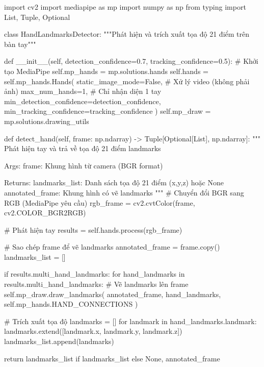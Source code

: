 \begin{aivncodebox}
\begin{python}
import cv2
import mediapipe as mp
import numpy as np
from typing import List, Tuple, Optional

class HandLandmarksDetector:
    """Phát hiện và trích xuất tọa độ 21 điểm trên bàn tay"""
    
    def __init__(self, detection_confidence=0.7, tracking_confidence=0.5):
        # Khởi tạo MediaPipe
        self.mp_hands = mp.solutions.hands
        self.hands = self.mp_hands.Hands(
            static_image_mode=False,        # Xử lý video (không phải ảnh)
            max_num_hands=1,                # Chỉ nhận diện 1 tay
            min_detection_confidence=detection_confidence,
            min_tracking_confidence=tracking_confidence
        )
        self.mp_draw = mp.solutions.drawing_utils
    
    def detect_hand(self, frame: np.ndarray) -> Tuple[Optional[List], np.ndarray]:
        """
        Phát hiện tay và trả về tọa độ 21 điểm landmarks
        
        Args:
            frame: Khung hình từ camera (BGR format)
            
        Returns:
            landmarks_list: Danh sách tọa độ 21 điểm (x,y,z) hoặc None
            annotated_frame: Khung hình có vẽ landmarks
        """
        # Chuyển đổi BGR sang RGB (MediaPipe yêu cầu)
        rgb_frame = cv2.cvtColor(frame, cv2.COLOR_BGR2RGB)
        
        # Phát hiện tay
        results = self.hands.process(rgb_frame)
        
        # Sao chép frame để vẽ landmarks
        annotated_frame = frame.copy()
        landmarks_list = []
        
        if results.multi_hand_landmarks:
            for hand_landmarks in results.multi_hand_landmarks:
                # Vẽ landmarks lên frame
                self.mp_draw.draw_landmarks(
                    annotated_frame, 
                    hand_landmarks, 
                    self.mp_hands.HAND_CONNECTIONS
                )
                
                # Trích xuất tọa độ
                landmarks = []
                for landmark in hand_landmarks.landmark:
                    landmarks.extend([landmark.x, landmark.y, landmark.z])
                landmarks_list.append(landmarks)
        
        return landmarks_list if landmarks_list else None, annotated_frame
\end{python}
\end{aivncodebox}

